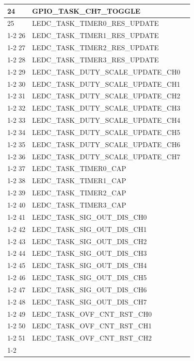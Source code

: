 \documentclass[main\_\_CN.tex]{subfiles}
\begin{document}
\begin{longtable}{ | l | l | l | }
24  & GPIO\_TASK\_CH7\_TOGGLE  &  \\ \hline
25  & LEDC\_TASK\_TIMER0\_RES\_UPDATE      & \nameref{mod:ledpwm} \\ \cline{1-2}
26  & LEDC\_TASK\_TIMER1\_RES\_UPDATE      & \\ \cline{1-2}
27  & LEDC\_TASK\_TIMER2\_RES\_UPDATE      & \\ \cline{1-2}
28  & LEDC\_TASK\_TIMER3\_RES\_UPDATE      & \\ \cline{1-2}
29  & LEDC\_TASK\_DUTY\_SCALE\_UPDATE\_CH0 & \\ \cline{1-2}
30  & LEDC\_TASK\_DUTY\_SCALE\_UPDATE\_CH1 & \\ \cline{1-2}
31  & LEDC\_TASK\_DUTY\_SCALE\_UPDATE\_CH2 & \\ \cline{1-2}
32  & LEDC\_TASK\_DUTY\_SCALE\_UPDATE\_CH3 & \\ \cline{1-2}
33  & LEDC\_TASK\_DUTY\_SCALE\_UPDATE\_CH4 & \\ \cline{1-2}
34  & LEDC\_TASK\_DUTY\_SCALE\_UPDATE\_CH5 & \\ \cline{1-2}
35  & LEDC\_TASK\_DUTY\_SCALE\_UPDATE\_CH6 & \\ \cline{1-2}
36  & LEDC\_TASK\_DUTY\_SCALE\_UPDATE\_CH7 & \\ \cline{1-2}
37  & LEDC\_TASK\_TIMER0\_CAP  & \\ \cline{1-2}
38  & LEDC\_TASK\_TIMER1\_CAP  & \\ \cline{1-2}
39  & LEDC\_TASK\_TIMER2\_CAP  & \\ \cline{1-2}
40  & LEDC\_TASK\_TIMER3\_CAP  & \\ \cline{1-2}
41  & LEDC\_TASK\_SIG\_OUT\_DIS\_CH0& \\ \cline{1-2}
42  & LEDC\_TASK\_SIG\_OUT\_DIS\_CH1& \\ \cline{1-2}
43  & LEDC\_TASK\_SIG\_OUT\_DIS\_CH2& \\ \cline{1-2}
44  & LEDC\_TASK\_SIG\_OUT\_DIS\_CH3& \\ \cline{1-2}
45  & LEDC\_TASK\_SIG\_OUT\_DIS\_CH4& \\ \cline{1-2}
46  & LEDC\_TASK\_SIG\_OUT\_DIS\_CH5& \\ \cline{1-2}
47  & LEDC\_TASK\_SIG\_OUT\_DIS\_CH6& \\ \cline{1-2}
48  & LEDC\_TASK\_SIG\_OUT\_DIS\_CH7& \\ \cline{1-2}
49  & LEDC\_TASK\_OVF\_CNT\_RST\_CH0& \\ \cline{1-2}
50  & LEDC\_TASK\_OVF\_CNT\_RST\_CH1& \\ \cline{1-2}
51  & LEDC\_TASK\_OVF\_CNT\_RST\_CH2& \\ \cline{1-2}

\end{longtable}
\end{document}
